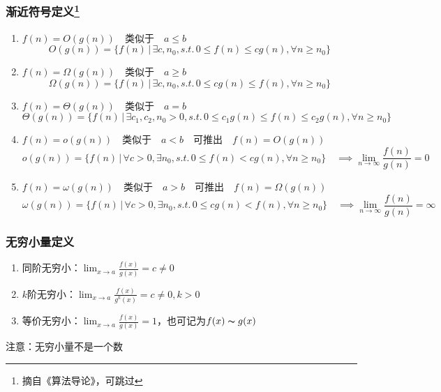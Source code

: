 \subsubsection{渐近符号定义\protect\footnote{摘自《算法导论》，可跳过}}
\begin{enumerate}
	\item $f(n)=O(g(n))\quad$类似于$\quad a\leq b$
	\[O(g(n))=\{f(n)\,|\,\exists c,n_0,s.t.\,0\leq f(n)\leq cg(n),\forall n\geq n_0\}\]
	\item $f(n)=\Omega(g(n))\quad$类似于$\quad a\geq b$
	\[\Omega(g(n))=\{f(n)\,|\,\exists c,n_0,s.t.\,0\leq cg(n)\leq f(n),\forall n\geq n_0\}\]
	\item $f(n)=\Theta(g(n))\quad$类似于$\quad a=b$
	\[\Theta(g(n))=\{f(n)\,|\,\exists c_1,c_2,n_0>0,s.t.\,0\leq c_1g(n)\leq f(n)\leq c_2g(n),\forall n\geq n_0\}\]
	\item $f(n)=o(g(n))\quad$类似于$\quad a<b\quad$可推出$\quad f(n)=O(g(n))$
	\[o(g(n))=\{f(n)\,|\,\forall c>0,\exists n_0,s.t.\,0\leq f(n)< cg(n),\forall n\geq n_0\}\quad\implies\lim_{n\to\infty}\frac{f(n)}{g(n)}=0\]
	\item $f(n)=\omega(g(n))\quad$类似于$\quad a>b\quad$可推出$\quad f(n)=\Omega(g(n))$
	\[\omega(g(n))=\{f(n)\,|\,\forall c>0,\exists n_0,s.t.\,0\leq cg(n)< f(n),\forall n\geq n_0\}\quad\implies\lim_{n\to\infty}\frac{f(n)}{g(n)}=\infty\]
\end{enumerate}

\subsubsection{无穷小量定义}
\begin{enumerate}
	\item 同阶无穷小：$\displaystyle\lim_{x\to a}\frac{f(x)}{g(x)}=c\ne 0$
	\item $k$阶无穷小：$\displaystyle\lim_{x\to a}\frac{f(x)}{g^k(x)}=c\ne 0,k>0$
	\item 等价无穷小：$\displaystyle\lim_{x\to a}\frac{f(x)}{g(x)}=1$，也可记为$f(x)\thicksim g(x)$
\end{enumerate}
注意：无穷小量不是一个数

